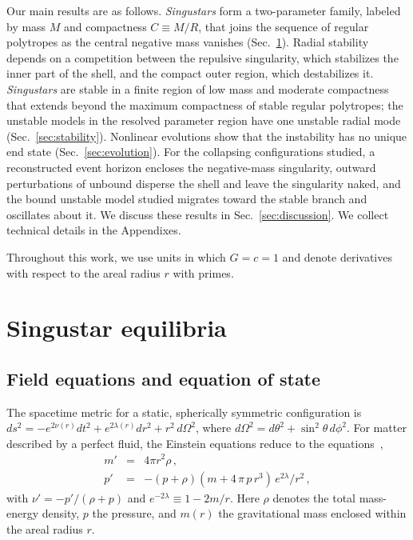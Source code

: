 \documentclass[%
 reprint,
 amsmath,amssymb,
 aps,prd,
 superscriptaddress,
]{revtex4-2}
\begin{document}
Our main results are as follows. \emph{Singustars} form a two-parameter family, labeled by mass $M$ and compactness $C\equiv M/R$, that joins the sequence of regular polytropes as the central negative mass vanishes (Sec.~\ref{sec:equilibria}). Radial stability depends on a competition between the repulsive singularity, which stabilizes the inner part of the shell, and the compact outer region, which destabilizes it. \emph{Singustars} are stable in a finite region of low mass and moderate compactness that extends beyond the maximum compactness of stable regular polytropes; the unstable models in the resolved parameter region have one unstable radial mode (Sec.~\ref{sec:stability}). Nonlinear evolutions show that the instability has no unique end state (Sec.~\ref{sec:evolution}). For the collapsing configurations studied, a reconstructed event horizon encloses the negative-mass singularity, outward perturbations of unbound  disperse the shell and leave the singularity naked, and the bound unstable model studied migrates toward the stable branch and oscillates about it. We discuss these results in Sec.~\ref{sec:discussion}. We collect technical details in the Appendixes.

Throughout this work, we use units in which $G=c=1$ and denote derivatives with respect to the areal radius $r$ with primes.

\section{Singustar equilibria}
\label{sec:equilibria}

\subsection{Field equations and equation of state}

The spacetime metric for a static, spherically symmetric configuration is $ds^2=-e^{2\nu(r)}dt^2+e^{2\lambda(r)}dr^2+r^2\,d\Omega^2$, where $d\Omega^2=d\theta^2+\sin^2\theta\,d\phi^2$. For matter described by a perfect fluid, the Einstein equations reduce to the \tov{} equations~\cite{oppenheimer,Tolman1934-TOLRTA},
\begin{eqnarray}
    m'&=&4\pi r^2\rho\,,\label{eq:tov1a}\\
    p'&=&-(p+\rho)(m+4\,\pi\, p\, r^3)\,e^{2\lambda}/r^2\,,\label{eq:tov2a}
\end{eqnarray}
with $\nu'=-p'/(\rho+p)$ and $e^{-2\lambda}\equiv1-2m/r$. Here $\rho$ denotes the total mass-energy density, $p$ the pressure, and $m(r)$ the gravitational mass enclosed within the areal radius $r$.
\end{document}
